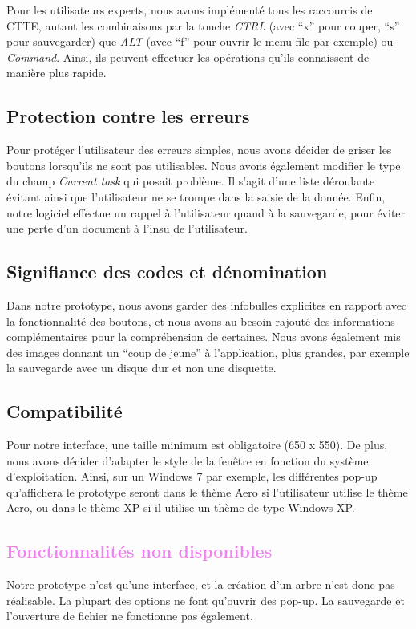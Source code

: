 \documentclass[12pt, a4paper]{article}
\begin{document}
Pour les utilisateurs experts, nous avons implémenté tous les raccourcis de CTTE, autant les combinaisons par la touche \emph{CTRL} (avec ``x'' pour couper, ``s'' pour sauvegarder) que \emph{ALT} (avec ``f'' pour ouvrir le menu file par exemple) ou \emph{Command}. Ainsi, ils peuvent effectuer les opérations qu'ils connaissent de manière plus rapide. 
\textcolor{NavyBlue}{\subsection{Protection contre les erreurs}}

Pour protéger l'utilisateur des erreurs simples, nous avons décider de griser les boutons lorsqu'ils ne sont pas utilisables. Nous avons également modifier le type du champ \emph{Current task} qui posait problème. Il s'agit d'une liste déroulante évitant ainsi que l'utilisateur ne se trompe dans la saisie de la donnée. Enfin, notre logiciel effectue un rappel à l'utilisateur quand à la sauvegarde, pour éviter une perte d'un document à l'insu de l'utilisateur.

\textcolor{NavyBlue}{\subsection{Signifiance des codes et dénomination}}

Dans notre prototype, nous avons garder des infobulles explicites en rapport avec la fonctionnalité des boutons, et nous avons au besoin rajouté des informations complémentaires pour la compréhension de certaines. Nous avons également mis des images donnant un ``coup de jeune'' à l'application, plus grandes, par exemple la sauvegarde avec un disque dur et non une disquette.

\textcolor{NavyBlue}{\subsection{Compatibilité}}

Pour notre interface, une taille minimum est obligatoire (650 x 550). De plus, nous avons décider d'adapter le style de la fenêtre en fonction du système d'exploitation. Ainsi, sur un Windows 7 par exemple, les différentes pop-up qu'affichera le prototype seront dans le thème Aero si l'utilisateur utilise le thème Aero, ou dans le thème XP si il utilise un thème de type Windows XP.

\textcolor{Violet}{\section{Fonctionnalités non disponibles}}

Notre prototype n'est qu'une interface, et la création d'un arbre n'est donc pas réalisable. La plupart des options ne font qu'ouvrir des pop-up. La sauvegarde et l'ouverture de fichier ne fonctionne pas également.
\end{document}

